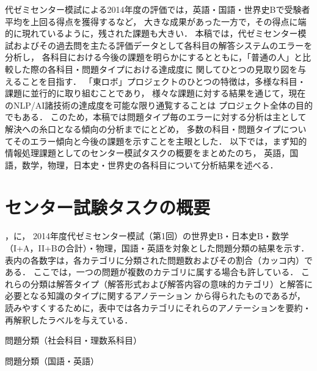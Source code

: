 \documentclass[japanese]{jnlp_1.4b}
\def\TABREF#1{}
\begin{document}
代ゼミセンター模試による2014年度の評価では，英語・国語・世界史Bで受験者平均を上回る得点を獲得するなど，
大きな成果があった一方で，その得点に端的に現れているように，残された課題も大きい．
本稿では，代ゼミセンター模試およびその過去問を主たる評価データとして各科目の解答システムのエラーを分析し，
各科目における今後の課題を明らかにするとともに，「普通の人」と比較した際の各科目・問題タイプにおける達成度に
関してひとつの見取り図を与えることを目指す．
「東ロボ」プロジェクトのひとつの特徴は，多様な科目・課題に並行的に取り組むことであり，
様々な課題に対する結果を通じて，現在のNLP/AI諸技術の達成度を可能な限り通覧することは
プロジェクト全体の目的でもある．
このため，本稿では問題タイプ毎のエラーに対する分析は主として解決への糸口となる傾向の分析までにとどめ，
多数の科目・問題タイプについてそのエラー傾向と今後の課題を示すことを主眼とした．
以下では，まず知的情報処理課題としてのセンター模試タスクの概要をまとめたのち，
英語，国語，数学，物理，日本史・世界史の各科目について分析結果を述べる．



\section{センター試験タスクの概要}

\TABREF{tab:overview:risha}，\TABREF{tab:overview:eikoku}に，
2014年度代ゼミセンター模試（第1回）の世界史B・日本史B・数学（I+A，II+Bの合計）・物理，国語・英語を対象とした問題分類の結果を示す．
表内の各数字は，各カテゴリに分類された問題数およびその割合（カッコ内）である．
ここでは，一つの問題が複数のカテゴリに属する場合も許している．
これらの分類は解答タイプ（解答形式および解答内容の意味的カテゴリ）と解答に必要となる知識のタイプに関するアノテーション\cite{MiyaoKawazoe2013IJCNLP}
から得られたものであるが，読みやすくするために，表中では各カテゴリにそれらのアノテーションを要約・再解釈したラベルを与えている．

\begin{table}[t]
\caption{問題分類（社会科目・理数系科目）}
\label{tab:overview:risha}

\end{table}
\begin{table}[t]
\caption{問題分類（国語・英語）}
\label{tab:overview:eikoku}

\end{table}
\end{document}
